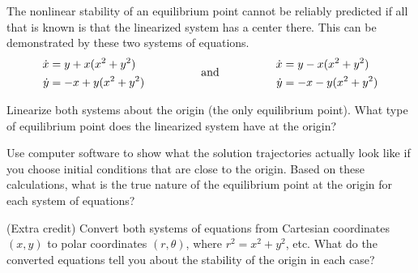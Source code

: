 \documentclass[boxes]{gsypset}
\begin{document}
	\begin{problem}
		The nonlinear stability of an equilibrium point cannot be
	  reliably predicted if all that is known is that the linearized
	  system has a center there.  This can be demonstrated by these two
	  systems of equations.
		\begin{align*}{3}
			\dot{x} &= y+x(x^2+y^2) & 
				\qquad\qquad &\raisebox{-.1in}[0mm][0mm]{\text{and}} \qquad\qquad &
				\dot{x}&=y-x(x^2+y^2) \\
			\dot{y} &= -x+y(x^2+y^2) &&& \dot{y} &= -x-y(x^2+y^2)
		\end{align*}
		\begin{subproblems}
			\subproblem 
				Linearize both systems about the origin (the only equilibrium point). 
				What type of equilibrium point does the linearized system have at the origin?
				\begin{solution}
					
				\end{solution}
			\subproblem 
				Use computer software to show what the solution trajectories actually look like 
				if you choose initial conditions that are close to the origin. 
				Based on these calculations, what is the true nature of 
				the equilibrium point at the origin for each system of equations?
				\begin{solution}
					
				\end{solution}
			\subproblem (Extra credit) 
				Convert both systems of equations from Cartesian coordinates $(x,y)$ 
				to polar coordinates $(r,\theta)$, where $r^2=x^2+y^2$, etc. 
				What do the converted equations tell you about the stability of the origin in each case?
				\begin{solution}
					
				\end{solution}
		\end{subproblems}
	\end{problem}
	
\end{document}
